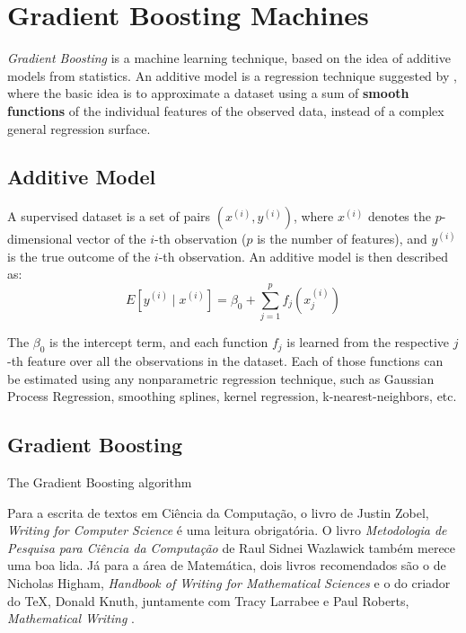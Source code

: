 \chapter{Gradient Boosting Machines}
\label{cap:boosting-intro}

\textit{Gradient Boosting} is a machine learning technique, based on the idea of additive models from statistics. An additive model is a  regression technique suggested by , where the basic idea is to approximate a dataset using a sum of \textbf{smooth functions} of the individual features of the observed data, instead of a complex general regression surface.

\section{Additive Model}

A supervised dataset is a set of pairs $(x^{(i)}, y^{(i)})$, where $x^{(i)}$ denotes the $p$-dimensional vector of the $i$-th observation ($p$ is the number of features), and $y^{(i)}$ is the true outcome of the $i$-th observation. An additive model is then described as:
$$E[y^{(i)}\mid x^{(i)}] = \beta_0 + \sum_{j=1}^pf_j(x^{(i)}_j)$$

The $\beta_0$ is the intercept term, and each function $f_j$ is learned from the respective $j$-th feature over all the observations in the dataset. Each of those functions can be estimated using any nonparametric regression technique, such as Gaussian Process Regression, smoothing splines, kernel regression, k-nearest-neighbors, etc.

\section{Gradient Boosting}

The Gradient Boosting algorithm



Para a escrita de textos em Ciência da Computação, o livro de Justin Zobel, 
\emph{Writing for Computer Science} \cite{zobel:04} é uma leitura obrigatória. 
O livro \emph{Metodologia de Pesquisa para Ciência da Computação} de 
Raul Sidnei Wazlawick \cite{waz:09} também merece uma boa lida.
Já para a área de Matemática, dois livros recomendados são o de Nicholas Higham,
\emph{Handbook of Writing for Mathematical Sciences} \cite{Higham:98} e o do criador
do \TeX, Donald Knuth, juntamente com Tracy Larrabee e Paul Roberts, 
\emph{Mathematical Writing} \cite{Knuth:96}.

